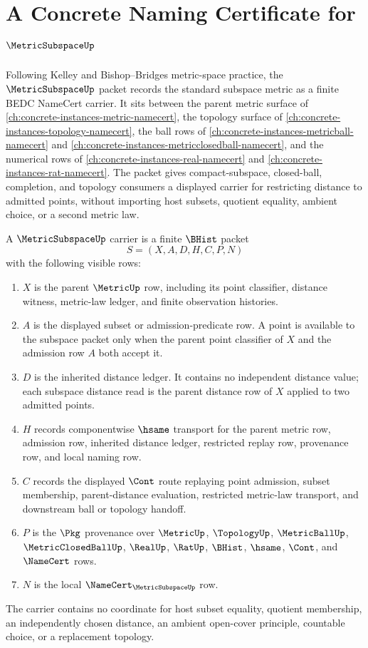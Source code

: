 \chapter{A Concrete Naming Certificate for $\MetricSubspaceUp$}
\label{ch:concrete-instances-metric-subspace-namecert}

Following Kelley and Bishop--Bridges metric-space practice, the $\MetricSubspaceUp$ packet records the standard subspace metric as a finite BEDC NameCert carrier. It sits between the parent metric surface of \autoref{ch:concrete-instances-metric-namecert}, the topology surface of \autoref{ch:concrete-instances-topology-namecert}, the ball rows of \autoref{ch:concrete-instances-metricball-namecert} and \autoref{ch:concrete-instances-metricclosedball-namecert}, and the numerical rows of \autoref{ch:concrete-instances-real-namecert} and \autoref{ch:concrete-instances-rat-namecert}. The packet gives compact-subspace, closed-ball, completion, and topology consumers a displayed carrier for restricting distance to admitted points, without importing host subsets, quotient equality, ambient choice, or a second metric law.

\begin{definition}
\label{def:metric-subspace-carrier}
A $\MetricSubspaceUp$ carrier is a finite $\BHist$ packet
$$
S=(X,A,D,H,C,P,N)
$$
with the following visible rows:
\begin{enumerate}
\item $X$ is the parent $\MetricUp$ row, including its point classifier, distance witness, metric-law ledger, and finite observation histories.
\item $A$ is the displayed subset or admission-predicate row. A point is available to the subspace packet only when the parent point classifier of $X$ and the admission row $A$ both accept it.
\item $D$ is the inherited distance ledger. It contains no independent distance value; each subspace distance read is the parent distance row of $X$ applied to two admitted points.
\item $H$ records componentwise $\hsame$ transport for the parent metric row, admission row, inherited distance ledger, restricted replay row, provenance row, and local naming row.
\item $C$ records the displayed $\Cont$ route replaying point admission, subset membership, parent-distance evaluation, restricted metric-law transport, and downstream ball or topology handoff.
\item $P$ is the $\Pkg$ provenance over $\MetricUp$, $\TopologyUp$, $\MetricBallUp$, $\MetricClosedBallUp$, $\RealUp$, $\RatUp$, $\BHist$, $\hsame$, $\Cont$, and $\NameCert$ rows.
\item $N$ is the local $\NameCert_{\MetricSubspaceUp}$ row.
\end{enumerate}
The carrier contains no coordinate for host subset equality, quotient membership, an independently chosen distance, an ambient open-cover principle, countable choice, or a replacement topology.
\end{definition}

